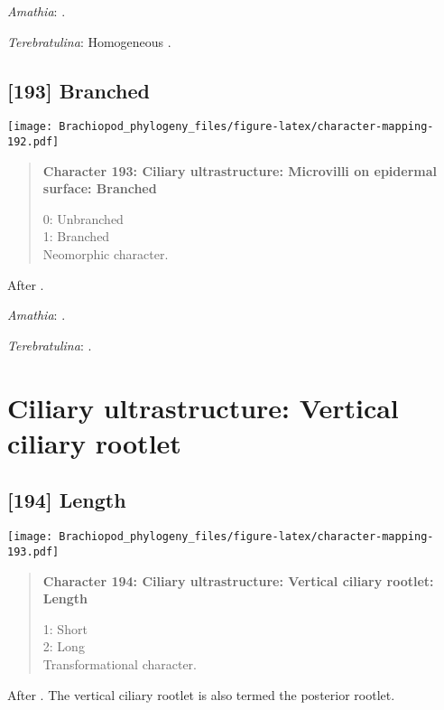 \documentclass[openany]{book}
\theoremstyle{definition}
\theoremstyle{definition}
\theoremstyle{definition}
\theoremstyle{remark}
\begin{document}
\hypertarget{Amathia-coding-192}{}
\emph{Amathia}: \citet{Reed1982}.

\hypertarget{Terebratulina-coding-192}{}
\emph{Terebratulina}: Homogeneous \citep{Luter1995}.

\subsection*{{[}193{]} Branched}\label{branched}

\texttt{[image: Brachiopod\_phylogeny\_files/figure-latex/character-mapping-192.pdf]}

\begin{quote}
\textbf{Character 193: Ciliary ultrastructure: Microvilli on epidermal
surface: Branched}

0: Unbranched\\
1: Branched\\
Neomorphic character.
\end{quote}

After \citet{Lundin2009}.

\hypertarget{Amathia-coding-193}{}
\emph{Amathia}: \citet{Reed1982}.

\hypertarget{Terebratulina-coding-193}{}
\emph{Terebratulina}: \citep{Luter1995}.

\section{Ciliary ultrastructure: Vertical ciliary
rootlet}\label{ciliary-ultrastructure-vertical-ciliary-rootlet}

\subsection*{{[}194{]} Length}\label{length}

\texttt{[image: Brachiopod\_phylogeny\_files/figure-latex/character-mapping-193.pdf]}

\begin{quote}
\textbf{Character 194: Ciliary ultrastructure: Vertical ciliary rootlet:
Length}

1: Short\\
2: Long\\
Transformational character.
\end{quote}

After \citet{Lundin2009}. The vertical ciliary rootlet is also termed
the posterior rootlet.
\end{document}
